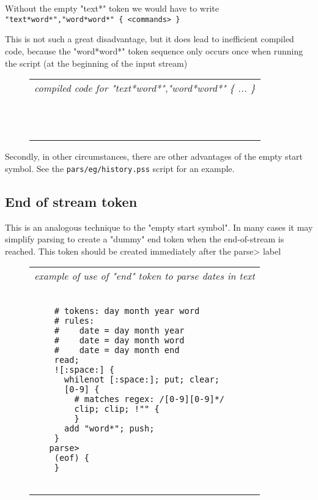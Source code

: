 \documentclass[a4paper,12pt]{article}
\begin{document}
  Without the empty "text*" token we would have to write 
 \verb| "text*word*","word*word*" { <commands> } |


  This is not such a great disadvantage, but it does lead to
  inefficient compiled code, because the "word*word*" token
  sequence only occurs once when running the script (at the
  beginning of the input stream)
 \begin{figure}
 \begin{tabular}{ l }
 \emph{ compiled code for "text*word*","word*word*" \{ ... \} } \\ 
 \begin{lstlisting}[breaklines] 

  
 \end{lstlisting} 
 \end{tabular} 

 \end{figure}

  Secondly, in other circumstances, there are other advantages
  of the empty start symbol. See the \texttt{pars/eg/history.pss} script
  for an example.

\subsection{End of stream token}
 
  This is an analogous technique to the "empty start symbol". In
  many cases it may simplify parsing to create a "dummy" end token
  when the end-of-stream is reached. This token should be created
  immediately after the parse> label
 \begin{figure}
 \begin{tabular}{ l }
 \emph{ example of use of "end" token to parse dates in text } \\ 
 \begin{lstlisting}[breaklines] 

    # tokens: day month year word
    # rules: 
    #    date = day month year
    #    date = day month word 
    #    date = day month end
    read;
    ![:space:] { 
      whilenot [:space:]; put; clear; 
      [0-9] {
        # matches regex: /[0-9][0-9]*/
        clip; clip; !"" {
        }
      add "word*"; push;
    }
   parse>
    (eof) {
    }
  
 \end{lstlisting} 
 \end{tabular} 

 \end{figure}
\end{document}
